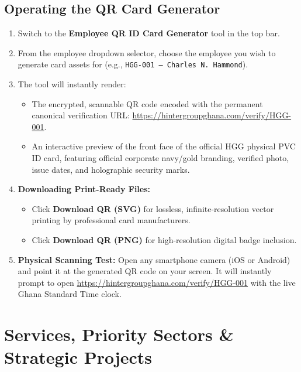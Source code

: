 \documentclass[11pt,a4paper,oneside]{book}
\begin{document}
\section{Operating the QR Card Generator}
\begin{enumerate}[leftmargin=*,label=\textbf{Step \arabic*:}]
  \item Switch to the \textbf{Employee QR ID Card Generator} tool in the top bar.
  \item From the employee dropdown selector, choose the employee you wish to generate card assets for (e.g., \texttt{HGG-001 — Charles N. Hammond}).
  \item The tool will instantly render:
    \begin{itemize}[leftmargin=1.2cm]
      \item The encrypted, scannable QR code encoded with the permanent canonical verification URL: \url{https://hintergroupghana.com/verify/HGG-001}.
      \item An interactive preview of the front face of the official HGG physical PVC ID card, featuring official corporate navy/gold branding, verified photo, issue dates, and holographic security marks.
    \end{itemize}
  \item \textbf{Downloading Print-Ready Files:}
    \begin{itemize}[leftmargin=1.2cm]
      \item Click \textbf{Download QR (SVG)} for lossless, infinite-resolution vector printing by professional card manufacturers.
      \item Click \textbf{Download QR (PNG)} for high-resolution digital badge inclusion.
    \end{itemize}
  \item \textbf{Physical Scanning Test:} Open any smartphone camera (iOS or Android) and point it at the generated QR code on your screen. It will instantly prompt to open \url{https://hintergroupghana.com/verify/HGG-001} with the live Ghana Standard Time clock.
\end{enumerate}

\chapter{Services, Priority Sectors \& Strategic Projects}
\label{chap:services_projects}
\end{document}
